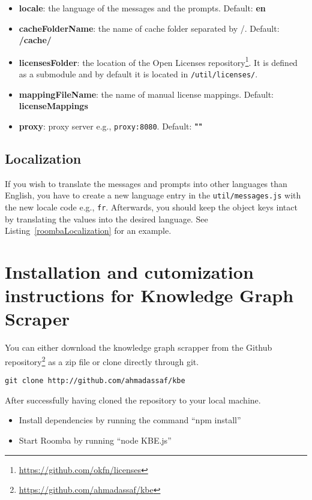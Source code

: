 \begin{itemize}
	\item \textbf{locale}: the language of the messages and the prompts. Default: \textbf{en}
	\item \textbf{cacheFolderName}: the name of cache folder separated by /. Default: \textbf{/cache/}
	\item \textbf{licensesFolder}: the location of the Open Licenses repository\footnote{\url{https://github.com/okfn/licenses}}. It is defined as a submodule and by default it is located in \texttt{/util/licenses/}.
	\item \textbf{mappingFileName}: the name of manual license mappings. Default: \textbf{licenseMappings}
	\item \textbf{proxy}: proxy server e.g., \texttt{proxy:8080}. Default: \textbf{""}
\end{itemize}

\subsection{Localization}

If you wish to translate the messages and prompts into other languages than English, you have to create a new language entry in the \texttt{util/messages.js} with the new locale code e.g., \texttt{fr}. Afterwards, you should keep the object keys intact by translating the values into the desired language. See Listing~\ref{roombaLocalization} for an example.



\section{Installation and cutomization instructions for Knowledge Graph Scraper}
\label{section:installation_KGB}

You can either download the knowledge graph scrapper from the Github repository\footnote{\url{https://github.com/ahmadassaf/kbe}} as a zip file or clone directly through git.

\begin{verbatim}
git clone http://github.com/ahmadassaf/kbe
\end{verbatim}

After successfully having cloned the repository to your local machine.
\begin{itemize}
	\item Install dependencies by running the command ``npm install''
	\item Start Roomba by running ``node KBE.js''
\end{itemize}

